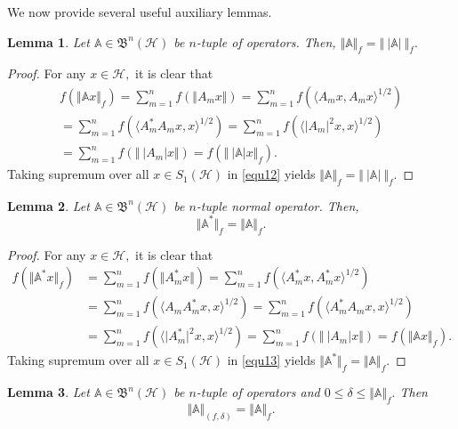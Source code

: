 \documentclass[12pt]{article}
\newtheorem{lemma}{Lemma}
\begin{document}
We now provide several useful auxiliary lemmas.
\begin{lemma}
\label{lem1}
Let $\mathbb{A}\in \mathfrak{B}^{n}(\mathcal{H})$ be $n$-tuple of operators. Then,
\(
\Vert \mathbb{A}\Vert_{f} = \Vert \ \vert  \mathbb{A} \vert \  \Vert_f.
\)
\end{lemma}
\begin{proof} For any $ x\in \mathcal{H}, $ it is clear that
\begin{multline}
\label{equ12}
 f\left( \Vert \mathbb{A} x \Vert_{f} \right) = \sum\limits_{m=1}^{n}f\left( \Vert A_{m}x \Vert \right)  = \sum\limits_{m=1}^{n}f\left( \langle A_{m}x,A_{m}x\rangle^{1/2} \right)  \\
 = \sum\limits_{m=1}^{n}f\left( \langle A_{m}^{*}A_{m}x,x\rangle^{1/2} \right)=\sum\limits_{m=1}^{n}f\left( \langle \vert A_{m} \vert^{2}x,x \rangle ^{1/2}  \right)  \\
 =\sum\limits_{m=1}^{n}f\left( \Vert \ \vert A_{m} \vert x  \Vert \right) =f\left( \Vert \ \vert \mathbb{A} \vert x  \Vert_{f} \right).
\end{multline}
Taking supremum over all $ x\in S_{1}(\mathcal{H}) $ in \eqref{equ12} yields
\(\Vert \mathbb{A}\Vert_{f} = \Vert \ \vert  \mathbb{A} \vert \  \Vert_f.\)
\end{proof}

\begin{lemma}
\label{lem2}
Let $\mathbb{A}\in \mathfrak{B}^{n}(\mathcal{H})$ be $n$-tuple normal operator. Then,
\[
\Vert \mathbb{A}^{*}\Vert_{f} = \Vert \mathbb{A} \Vert_f.
\]
\end{lemma}
\begin{proof}  For any $ x\in \mathcal{H}, $ it is clear that
\begin{align}
\label{equ13}
f\left( \Vert \mathbb{A}^{*} x \Vert_{f} \right)
&= \sum\limits_{m=1}^{n}f\left( \Vert A_{m}^{*}x \Vert \right) = \sum\limits_{m=1}^{n}f\left( \langle A_{m}^{*}x,A_{m}^{*}x\rangle^{1/2} \right) \nonumber \\
&= \sum\limits_{m=1}^{n}f\left( \langle A_{m}A_{m}^{*}x,x\rangle^{1/2} \right) = \sum\limits_{m=1}^{n}f\left( \langle A_{m}^{*}A_{m}x,x\rangle^{1/2} \right) \nonumber \\
&=\sum\limits_{m=1}^{n}f\left( \langle \vert A_{m}^{*} \vert^{2}x,x \rangle ^{1/2}  \right) =\sum\limits_{m=1}^{n}f\left( \Vert \ \vert A_{m} \vert x  \Vert \right)
=f\left( \Vert  \mathbb{A} x  \Vert_{f} \right) .
\end{align}
Taking supremum over all $ x\in S_{1}(\mathcal{H})  $ in \eqref{equ13} yields
\(
\Vert \mathbb{A}^{*}\Vert_{f} = \Vert  \mathbb{A}  \Vert_f.
\)
\end{proof}
\begin{lemma}
\label{lem3}
Let $\mathbb{A}\in \mathfrak{B}^{n}(\mathcal{H})$ be $n$-tuple of operators and $ 0\leq \delta \leq \Vert \mathbb{A} \Vert_{f}. $
 Then
\[
\Vert \mathbb{A}\Vert_{(f,\delta)} = \Vert \mathbb{A} \Vert_f.
\]
\end{lemma}
\end{document}
